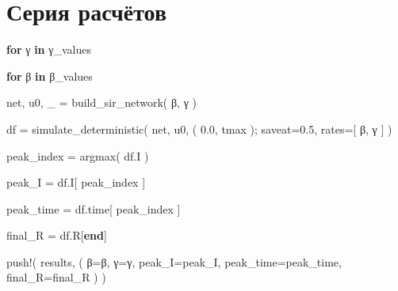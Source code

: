 \documentclass[
  english,
  russian,
  12pt,
  a4paper,
  DIV=11,
  numbers=noendperiod]{scrreprt}
\newenvironment{Shaded}{\begin{snugshade}}{\end{snugshade}}
\newcommand{\ControlFlowTok}[1]{\textcolor[rgb]{0.00,0.23,0.31}{\textbf{#1}}}
\newcommand{\FloatTok}[1]{\textcolor[rgb]{0.68,0.00,0.00}{#1}}
\newcommand{\FunctionTok}[1]{\textcolor[rgb]{0.28,0.35,0.67}{#1}}
\newcommand{\KeywordTok}[1]{\textcolor[rgb]{0.00,0.23,0.31}{\textbf{#1}}}
\newcommand{\NormalTok}[1]{\textcolor[rgb]{0.00,0.23,0.31}{#1}}
\newcommand{\OperatorTok}[1]{\textcolor[rgb]{0.37,0.37,0.37}{#1}}
\begin{document}
\section{Серия
расчётов}\label{ux441ux435ux440ux438ux44f-ux440ux430ux441ux447ux451ux442ux43eux432}

\begin{Shaded}
\begin{Highlighting}[]
\ControlFlowTok{for}\NormalTok{ γ }\KeywordTok{in}\NormalTok{ γ\_values}

    \ControlFlowTok{for}\NormalTok{ β }\KeywordTok{in}\NormalTok{ β\_values}

\NormalTok{        net,}
\NormalTok{        u0,}
\NormalTok{        \_ }\OperatorTok{=}
            \FunctionTok{build\_sir\_network}\NormalTok{(}
\NormalTok{                β,}
\NormalTok{                γ}
\NormalTok{            )}

\NormalTok{        df }\OperatorTok{=}
            \FunctionTok{simulate\_deterministic}\NormalTok{(}
\NormalTok{                net,}
\NormalTok{                u0,}
\NormalTok{                (}
                    \FloatTok{0.0}\NormalTok{,}
\NormalTok{                    tmax}
\NormalTok{                );}
\NormalTok{                saveat}\OperatorTok{=}\FloatTok{0.5}\NormalTok{,}
\NormalTok{                rates}\OperatorTok{=}\NormalTok{[}
\NormalTok{                    β,}
\NormalTok{                    γ}
\NormalTok{                ]}
\NormalTok{            )}

\NormalTok{        peak\_index }\OperatorTok{=}
            \FunctionTok{argmax}\NormalTok{(}
\NormalTok{                df.I}
\NormalTok{            )}

\NormalTok{        peak\_I }\OperatorTok{=}
\NormalTok{            df.I[}
\NormalTok{                peak\_index}
\NormalTok{            ]}

\NormalTok{        peak\_time }\OperatorTok{=}
\NormalTok{            df.time[}
\NormalTok{                peak\_index}
\NormalTok{            ]}

\NormalTok{        final\_R }\OperatorTok{=}
\NormalTok{            df.R[}\KeywordTok{end}\NormalTok{]}

        \FunctionTok{push!}\NormalTok{(}
\NormalTok{            results,}
\NormalTok{            (}
\NormalTok{                β}\OperatorTok{=}\NormalTok{β,}
\NormalTok{                γ}\OperatorTok{=}\NormalTok{γ,}
\NormalTok{                peak\_I}\OperatorTok{=}\NormalTok{peak\_I,}
\NormalTok{                peak\_time}\OperatorTok{=}\NormalTok{peak\_time,}
\NormalTok{                final\_R}\OperatorTok{=}\NormalTok{final\_R}
\NormalTok{            )}
\NormalTok{        )}


\end{Highlighting}
\end{Shaded}
\end{document}

